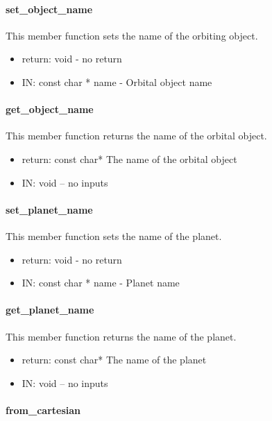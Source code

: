 \paragraph{set\_object\_name}

This member function sets the name of the orbiting object.

\begin{itemize}
\item{return:} void - no return
\item{IN:}    const char * name - Orbital object name
\end{itemize}

\paragraph{get\_object\_name}

This member function returns the name of the orbital object.
\begin{itemize}
\item{return:} const char* The name of the orbital object
\item{IN:}    void -- no inputs
\end{itemize}

\paragraph{set\_planet\_name}

This member function sets the name of the planet.

\begin{itemize}
\item{return:} void - no return
\item{IN:}    const char * name - Planet name
\end{itemize}

\paragraph{get\_planet\_name}

This member function returns the name of the planet.
\begin{itemize}
\item{return:} const char* The name of the planet
\item{IN:}    void -- no inputs
\end{itemize}

\paragraph{from\_cartesian}

